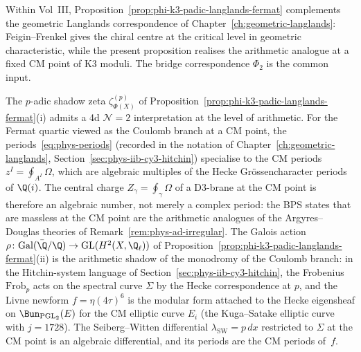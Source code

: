Within Vol~III, Proposition~\ref{prop:phi-k3-padic-langlands-fermat} complements the geometric Langlands correspondence of Chapter~\ref{ch:geometric-langlands}: Feigin--Frenkel gives the chiral centre at the critical level in geometric characteristic, while the present proposition realises the arithmetic analogue at a fixed CM point of K3 moduli. The bridge correspondence $\Phi_2$ is the common input.

\begin{remark}[Arithmetic CY Langlands and the 4d \texorpdfstring{$\mathcal{N}=2$}{N=2} perspective]
\label{rem:padic-4d-n2-arithmetic}
The $p$-adic shadow zeta $\zeta^{(p)}_{\Phi(X)}$ of Proposition~\ref{prop:phi-k3-padic-langlands-fermat}(i) admits a 4d $\mathcal{N}=2$ interpretation at the level of arithmetic. For the Fermat quartic viewed as the Coulomb branch at a CM point, the periods~\eqref{eq:phys-periods} (recorded in the notation of Chapter~\ref{ch:geometric-langlands}, Section~\ref{sec:phys-iib-cy3-hitchin}) specialise to the CM periods $z^I = \oint_{A^I} \Omega$, which are algebraic multiples of the Hecke Gr\"{o}ssencharacter periods of $\Q(i)$. The central charge $Z_\gamma = \oint_\gamma \Omega$ of a D3-brane at the CM point is therefore an algebraic number, not merely a complex period: the BPS states that are massless at the CM point are the arithmetic analogues of the Argyres--Douglas theories of Remark~\ref{rem:phys-ad-irregular}. The Galois action $\rho\colon \mathrm{Gal}(\bar{\Q}/\Q) \to \mathrm{GL}(H^2(X, \Q_\ell))$ of Proposition~\ref{prop:phi-k3-padic-langlands-fermat}(ii) is the arithmetic shadow of the monodromy of the Coulomb branch: in the Hitchin-system language of Section~\ref{sec:phys-iib-cy3-hitchin}, the Frobenius $\mathrm{Frob}_p$ acts on the spectral curve $\Sigma$ by the Hecke correspondence at $p$, and the Livne newform $f = \eta(4\tau)^6$ is the modular form attached to the Hecke eigensheaf on $\Bun_{\mathrm{PGL}_2}(E)$ for the CM elliptic curve $E_i$ (the Kuga--Satake elliptic curve with $j = 1728$). The Seiberg--Witten differential $\lambda_{\mathrm{SW}} = p\,dx$ restricted to $\Sigma$ at the CM point is an algebraic differential, and its periods are the CM periods of~$f$.
\end{remark}
